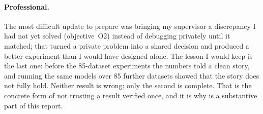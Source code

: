 \paragraph{Professional.}
The most difficult update to prepare was bringing my supervisor a discrepancy I had not yet solved
(objective~O2) instead of debugging privately until it matched; that turned a private problem into a
shared decision and produced a better experiment than I would have designed alone. The lesson I would
keep is the last one: before the 85-dataset \ucr{} experiments the \webtraffic{} numbers told a clean
story, and running the same models over 85 further datasets showed that the story does not fully
hold. Neither result is wrong; only the second is complete. That is the concrete form of not trusting
a result verified once, and it is why  is a substantive part of this
report.
